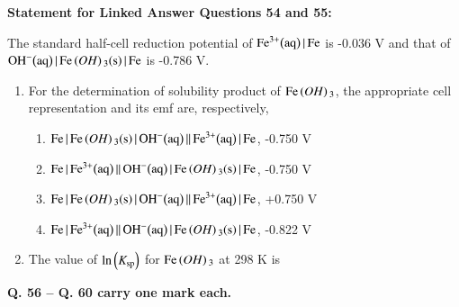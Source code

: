 \documentclass[journal,12pt,onecolumn]{IEEEtran}
\theoremstyle{remark}
\begin{document}
\textbf{Statement for Linked Answer Questions 54 and 55:}

The standard half-cell reduction potential of $\ce{Fe^3+\brak{aq} | Fe}$ is -0.036 V and that of $\ce{OH^{-}\brak{aq} | Fe\brak{OH}3\brak{s} | Fe}$ is -0.786 V.

\begin{enumerate}[resume]
\item For the determination of solubility product  of $\ce{Fe\brak{OH}3}$, the appropriate cell representation and its emf are, respectively,
    \begin{enumerate}
        \item $\ce{Fe | Fe\brak{OH}3\brak{s} | OH^{-}\brak{aq} || Fe^3+\brak{aq} | Fe}$, -0.750 V
        \item $\ce{Fe | Fe^3+\brak{aq} || OH^{-}\brak{aq} | Fe\brak{OH}3\brak{s} | Fe}$, -0.750 V
        \item $\ce{Fe | Fe\brak{OH}3\brak{s} | OH^{-}\brak{aq} || Fe^3+\brak{aq} | Fe}$, +0.750 V
        \item $\ce{Fe | Fe^3+\brak{aq} || OH^{-}\brak{aq} | Fe\brak{OH}3\brak{s} | Fe}$, -0.822 V
    \end{enumerate}
    \hfill{}
    


\item The value of $\ln\left(K_{\text{sp}}\right)$ for $\ce{Fe\brak{OH}3}$ at 298 K is
    \begin{enumerate}
    \end{enumerate}
    \hfill{}
\end{enumerate}


\textbf{Q. 56 -- Q. 60 carry one mark each.}
\end{document}
